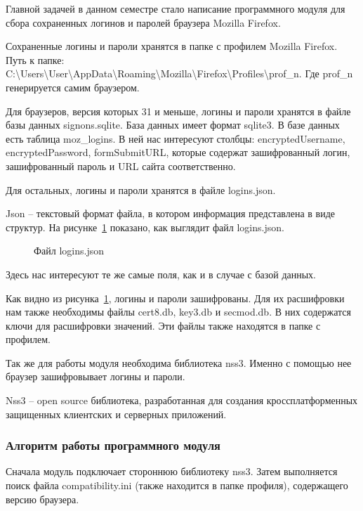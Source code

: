 Главной задачей в данном семестре стало написание программного модуля для сбора сохраненных логинов и паролей браузера Mozilla Firefox.

Сохраненные логины и пароли хранятся в папке с профилем Mozilla Firefox. Путь к папке: C:\textbackslash Users\textbackslash User\textbackslash AppData\textbackslash Roaming\textbackslash Mozilla\textbackslash Firefox\textbackslash Profiles\textbackslash prof\_n. Где prof\_n генерируется самим браузером.

Для браузеров, версия которых 31 и меньше, логины и пароли хранятся в файле базы данных signons.sqlite. База данных имеет формат sqlite3. В базе данных есть таблица moz\_logins. В ней нас интересуют столбцы: encryptedUsername, encryptedPassword, formSubmitURL, которые содержат зашифрованный логин, зашифрованный пароль и URL сайта соответственно.

Для остальных, логины и пароли хранятся в файле logins.json.

Json – текстовый формат файла, в котором информация представлена в виде структур. На рисунке~\ref{teresh_1:teresh_1} показано, как выглядит файл logins.json.

\begin{figure}[h!]
\caption{Файл logins.json}
\label{teresh_1:teresh_1}
\end{figure}

Здесь нас интересуют те же самые поля, как и в случае с базой данных.

Как видно из рисунка~\ref{teresh_1:teresh_1}, логины и пароли зашифрованы. Для их расшифровки нам также необходимы файлы cert8.db, key3.db и secmod.db. В них содержатся ключи для расшифровки значений. Эти файлы также находятся в папке с профилем.

Так же для работы модуля необходима библиотека nss3. Именно с помощью нее браузер зашифровывает логины и пароли.

Nss3 – open source библиотека, разработанная для создания кроссплатформенных защищенных клиентских и серверных приложений.

\subsubsection{Алгоритм работы программного модуля}

Сначала модуль подключает стороннюю библиотеку nss3. Затем выполняется поиск файла compatibility.ini (также находится в папке профиля), содержащего версию браузера.

